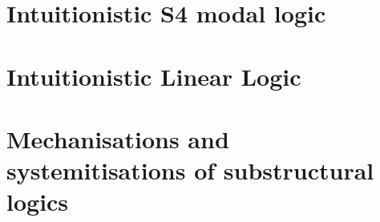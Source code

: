 \section{Intuitionistic S4 modal logic}\label{sec:modal}


\section{Intuitionistic Linear Logic}\label{sec:ill}


\section{Mechanisations and systemitisations of substructural logics}
\label{sec:linmech}

